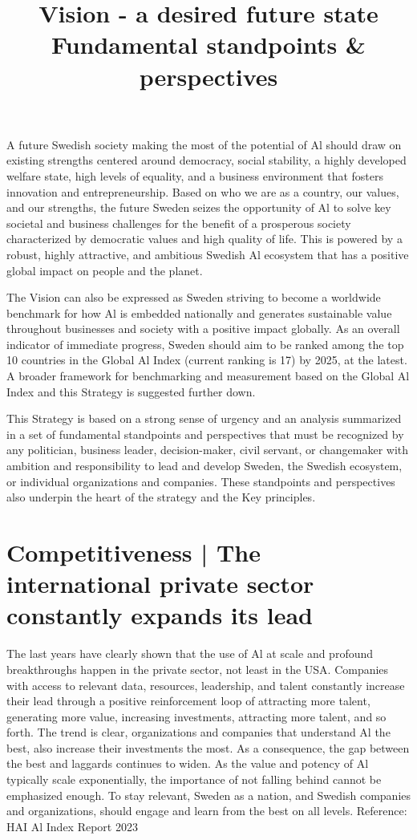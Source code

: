 \title{
Vision - a desired future state
}
A future Swedish society making the most of the potential of Al should draw on existing strengths centered around democracy, social stability, a highly developed welfare state, high levels of equality, and a business environment that fosters innovation and entrepreneurship.
Based on who we are as a country, our values, and our strengths, the future Sweden seizes the opportunity of Al to solve key societal and business challenges for the benefit of a prosperous society characterized by democratic values and high quality of life. This is powered by a robust, highly attractive, and ambitious Swedish Al ecosystem that has a positive global impact on people and the planet.

The Vision can also be expressed as Sweden striving to become a worldwide benchmark for how \(\mathrm{Al}\) is embedded nationally and generates sustainable value throughout businesses and society with a positive impact globally.
As an overall indicator of immediate progress, Sweden should aim to be ranked among the top 10 countries in the Global Al Index (current ranking is 17) by 2025, at the latest.
A broader framework for benchmarking and measurement based on the Global Al Index and this Strategy is suggested further down.

\title{
Fundamental standpoints \& perspectives
}
This Strategy is based on a strong sense of urgency and an analysis summarized in a set of fundamental standpoints and perspectives that must be recognized by any politician, business leader, decision-maker, civil servant, or changemaker with ambition and responsibility to lead and develop Sweden, the Swedish ecosystem, or individual organizations and companies.
These standpoints and perspectives also underpin the heart of the strategy and the Key principles.
\section*{Competitiveness | The international private sector constantly expands its lead}
The last years have clearly shown that the use of Al at scale and profound breakthroughs happen in the private sector, not least in the USA. Companies with access to relevant data, resources, leadership, and talent constantly increase their lead through a positive reinforcement loop of attracting more talent, generating more value, increasing investments, attracting more talent, and so forth.
The trend is clear, organizations and companies that understand Al the best, also increase their investments the most. As a consequence, the gap between the best and laggards continues to widen. As the value and potency of Al typically scale exponentially, the importance of not falling behind cannot be emphasized enough.
To stay relevant, Sweden as a nation, and Swedish companies and organizations, should engage and learn from the best on all levels.
Reference: HAI Al Index Report 2023
